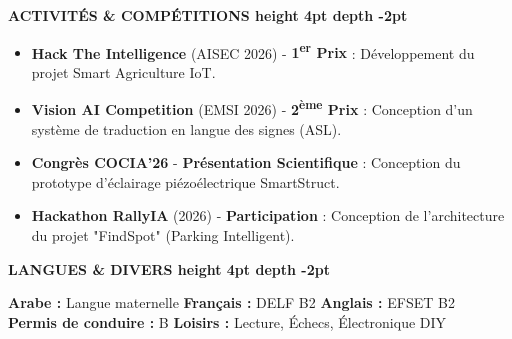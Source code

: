 \documentclass[10pt,a4paper]{altacv}
\renewcommand{\cvsection}[2][]{%
  \vspace{3pt}%
  {\color{heading}\LARGE\bfseries #2 \hspace{0.2em}\leaders\vrule height 4pt depth -2pt\hfill\mbox{}}\par\vspace{2pt}
}
\begin{document}
\cvsection{ACTIVITÉS \& COMPÉTITIONS}
\begin{itemize}[leftmargin=*, label=\textbullet, itemsep=2pt]
  \item \textbf{Hack The Intelligence} (AISEC 2026) - \textbf{1\textsuperscript{er} Prix} : {\small Développement du projet Smart Agriculture IoT.}
  \item \textbf{Vision AI Competition} (EMSI 2026) - \textbf{2\textsuperscript{ème} Prix} : {\small Conception d'un système de traduction en langue des signes (ASL).}
  \item \textbf{Congrès COCIA'26} - \textbf{Présentation Scientifique} : {\small Conception du prototype d'éclairage piézoélectrique SmartStruct.}
  \item \textbf{Hackathon RallyIA} (2026) - \textbf{Participation} : {\small Conception de l'architecture du projet "FindSpot" (Parking Intelligent).}
\end{itemize}


\cvsection{LANGUES \& DIVERS}
\textbf{Arabe :} Langue maternelle \hfill \textbf{Français :} DELF B2 \hfill \textbf{Anglais :} EFSET B2\\[2pt]
\textbf{Permis de conduire :} B \hfill \textbf{Loisirs :} Lecture, Échecs, Électronique DIY
\end{document}
